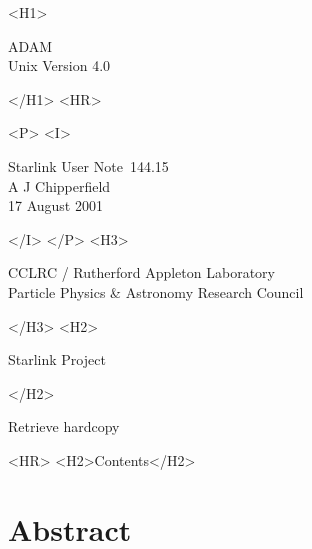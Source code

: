 \documentclass[twoside,11pt]{article}
\newcommand{\stardoccategory}  {Starlink User Note}
\newcommand{\stardocsource}    {sun\stardocnumber}
\newcommand{\stardocnumber}    {144.15}
\newcommand{\stardocauthors}   {A J Chipperfield}
\newcommand{\stardocdate}      {17 August 2001}
\newcommand{\stardoctitle}     {ADAM}
\newcommand{\stardocversion}   {Unix Version 4.0}
\newcommand{\stardocmanual}    {}
\newcommand{\htmladdnormallink}[2]{#1}
\newcommand{\htmladdimg}[1]{}
\newcommand{\htmlref}[2]{#1}
\newcommand{\htmladdtonavigation}[1]{}
\newcommand{\xlabel}[1]{}
\renewcommand{\_}{\texttt{\symbol{95}}}
\begin{document}
\begin{htmlonly}
   \xlabel{}
   \begin{rawhtml} <H1> \end{rawhtml}
      \stardoctitle\\
      \stardocversion\\
      \stardocmanual
   \begin{rawhtml} </H1> <HR> \end{rawhtml}


   \begin{rawhtml} <P> <I> \end{rawhtml}
   \stardoccategory\ \stardocnumber \\
   \stardocauthors \\
   \stardocdate
   \begin{rawhtml} </I> </P> <H3> \end{rawhtml}
      \htmladdnormallink{CCLRC / Rutherford Appleton Laboratory}
                        {http://www.cclrc.ac.uk} \\
      \htmladdnormallink{Particle Physics \& Astronomy Research Council}
                        {http://www.pparc.ac.uk} \\
   \begin{rawhtml} </H3> <H2> \end{rawhtml}
      \htmladdnormallink{Starlink Project}{http://www.starlink.rl.ac.uk/}
   \begin{rawhtml} </H2> \end{rawhtml}
   \htmladdnormallink{\htmladdimg{source.gif} Retrieve hardcopy}
      {http://www.starlink.rl.ac.uk/cgi-bin/hcserver?\stardocsource}\\

  \label{stardoccontents}
  \begin{rawhtml} 
    <HR>
    <H2>Contents</H2>
  \end{rawhtml}
  \htmladdtonavigation{\htmlref{\htmladdimg{contents_motif.gif}}
        {stardoccontents}}

  \section{\xlabel{abstract}Abstract}
\end{htmlonly}
\end{document}
